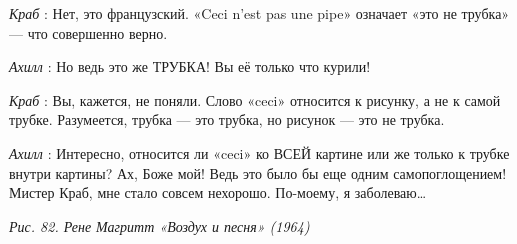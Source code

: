 \documentclass[../main.tex]{subfiles}
\begin{document}
\begin{dialogue}
\emph{Краб} : Нет, это французский. «Ceci n'est pas une pipe» означает «это не трубка» --- что совершенно верно.

\emph{Ахилл} : Но ведь это же ТРУБКА! Вы её только что курили!

\emph{Краб} : Вы, кажется, не поняли. Слово «ceci» относится к рисунку, а не к самой трубке. Разумеется, трубка --- это трубка, но рисунок --- это не трубка.

\emph{Ахилл} : Интересно, относится ли «ceci» ко ВСЕЙ картине или же только к трубке внутри картины? Ах, Боже мой! Ведь это было бы еще одним самопоглощением! Мистер Краб, мне стало совсем нехорошо. По-моему, я заболеваю\ldots{}

\emph{Рис. 82. Рене Магритт «Воздух и песня» (1964)}

\end{dialogue}
\end{document}
